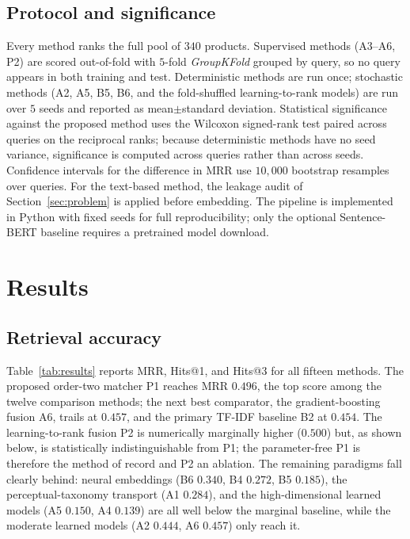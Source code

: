 \documentclass[conference]{IEEEtran}
\begin{document}
\subsection{Protocol and significance}
Every method ranks the full pool of $340$ products. Supervised methods (A3--A6, P2) are
scored out-of-fold with $5$-fold \emph{GroupKFold} grouped by query, so no query appears
in both training and test. Deterministic methods are run once; stochastic methods (A2,
A5, B5, B6, and the fold-shuffled learning-to-rank models) are run over $5$ seeds and
reported as mean$\pm$standard deviation. Statistical significance against the proposed
method uses the Wilcoxon signed-rank test paired across queries on the reciprocal ranks;
because deterministic methods have no seed variance, significance is computed across
queries rather than across seeds. Confidence intervals for the difference in MRR use
$10{,}000$ bootstrap resamples over queries. For the text-based method, the leakage audit
of Section~\ref{sec:problem} is applied before embedding. The pipeline is implemented in
Python with fixed seeds for full reproducibility; only the optional Sentence-BERT baseline
requires a pretrained model download.

\section{Results}\label{sec:results}

\subsection{Retrieval accuracy}
Table~\ref{tab:results} reports MRR, Hits@1, and Hits@3 for all fifteen methods. The
proposed order-two matcher P1 reaches MRR $0.496$, the top score among the twelve
comparison methods; the next best comparator, the gradient-boosting fusion A6, trails at
$0.457$, and the primary TF-IDF baseline B2 at $0.454$. The learning-to-rank fusion P2 is
numerically marginally higher ($0.500$) but, as shown below, is statistically
indistinguishable from P1; the parameter-free P1 is therefore the method of
record and P2 an ablation. The remaining paradigms fall clearly behind: neural
embeddings (B6 $0.340$, B4 $0.272$, B5 $0.185$), the perceptual-taxonomy transport (A1
$0.284$), and the high-dimensional learned models (A5 $0.150$, A4 $0.139$) are all well
below the marginal baseline, while the moderate learned models (A2 $0.444$, A6 $0.457$)
only reach it.
\end{document}

